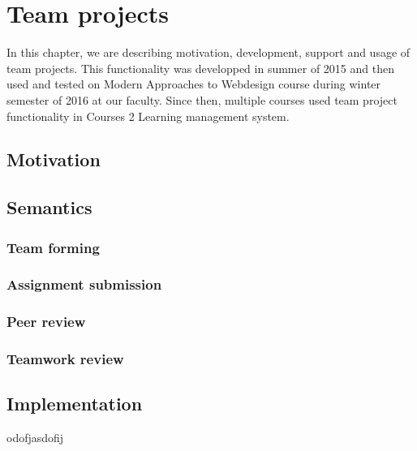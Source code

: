\chapter{Team projects}

In this chapter, we are describing motivation, development, support and usage of team projects. This functionality was developped in summer of 2015 and then used and tested on Modern Approaches to Webdesign course during winter semester of 2016 at our faculty. Since then, multiple courses used team project functionality in Courses 2 Learning management system.

\section{Motivation}




\section{Semantics}

\subsection{Team forming}

\subsection{Assignment submission}

\subsection{Peer review}

\subsection{Teamwork review}

\section{Implementation}
odofjasdofij